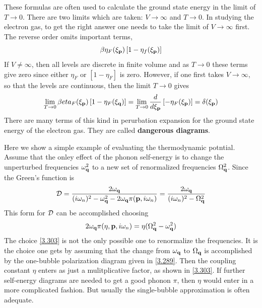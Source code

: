 These formulas are often used to calculate the ground state energy in the limit of $T\to0$.
There are two limits which are taken: $V\to\infty$ and $T\to0$.
In studying the electron gas, to get the right answer one needs to take the limit of $V\to\infty$ first.
The reverse order omits important terms,
\begin{equation}
    \beta \eta_F(\xi_{\mathbf{p}}) \left[ 1-\eta_f(\xi_{\mathbf{p}})\right]   \label{3.300}
\end{equation}
If $V\neq \infty$, then all levels are discrete in finite volume and as $T\to0$ these terms give zero since either $\eta_F$ or $\left[1-\eta_F\right]$ is zero.
However, if one first takes $V\to\infty$, so that the levels are continuous, then the limit $T\to 0$ gives
\begin{equation}
    \lim_{T\to0} \beta eta_F(\xi_{\mathbf{p}})\left[1 -\eta_F(\xi_{\mathbf{q}})\right] = \lim_{T\to0} \frac{d}{d \xi_{\mathbf{p}}} \left[ -\eta_F(\xi_{\mathbf{p}}) \right] = \delta(\xi_{\mathbf{p}})   \label{3.301}
\end{equation}
There are many terms of this kind in perurbation expansion for the ground state energy of the electron gas.
They are called \textbf{dangerous diagrams}.

Here we show a simple example of evaluating the thermodynamic potntial.
Assume that the onley effect of the phonon self-energy is to change the unperturbed frequencies $\omega_{\mathbf{q}}^2$ to a new set of renormalized frequencies $\Omega^2_{\mathbf{q}}$.
Since the Green's function is
\begin{equation}
    \mathcal{D} = \frac{2\omega_{\mathbf{q}}}{(i\omega_n)^2 - \omega_{\mathbf{q}}^2 - 2\omega_{\mathbf{q}} \pi(\mathbf{p},i\omega_n)} = \frac{2\omega_{\mathbf{q}}}{(i\omega_n)^2 - \Omega_{\mathbf{q}}^2} \label{3.302}
\end{equation}
This form for $\mathcal{D}$ can be accomplished choosing
\begin{equation}
    2\omega_{\mathbf{q}} \pi(\eta,\mathbf{p},i\omega_n) = \eta(\Omega_{\mathbf{q}}^2 - \omega_{\mathbf{q}}^2)     \label{3.303}
\end{equation}
The choice \eqref{3.303} is not the only possible one to renormalize the frequencies.
It is the choice one gets by assuming that the change from $\omega_{\mathbf{q}}$ to $\Omega_{\mathbf{q}}$ is accomplished by the one-bubble polarization diagram given in \eqref{3.289}.
Then the coupling constant $\eta$ enters as just a mulitplicative factor, as shown in \eqref{3.303}.
If further self-energy diagrams are needed to get a good phonon $\pi$, then $\eta$ would enter in a more complicated fashion.
But usually the single-bubble approximation is often adequate.

